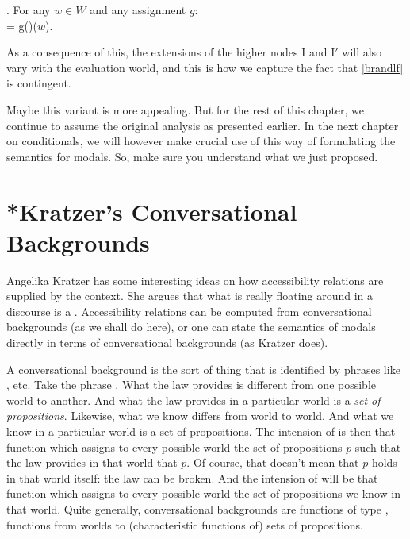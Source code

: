 \ex. For any $w\in W$ and any assignment $g$: \\
 = g()($w$).

As a consequence of this, the extensions of the higher nodes I and
I$'$ will also vary with the evaluation world, and this is how we
capture the fact that \ref{brandlf} is contingent.

Maybe this variant is more appealing. But for the rest of this
chapter, we continue to assume the original analysis as presented
earlier. In the next chapter on conditionals, we will however make
crucial use of this way of formulating the semantics for modals. So,
make sure you understand what we just proposed.

\section{*Kratzer's Conversational Backgrounds} \label{sec:kratz-conv-backgr}

Angelika Kratzer has some interesting ideas on how accessibility
relations are supplied by the context. She argues that what is really
floating around in a discourse is a .
Accessibility relations can be computed from conversational
backgrounds (as we shall do here), or one can state the semantics of
modals directly in terms of conversational backgrounds (as Kratzer
does).

A conversational background is the sort of thing that is identified by
phrases like , etc.
Take the phrase . What the law
provides is different from one possible world to another. And what the
law provides in a particular world is a \emph{set of propositions}.
Likewise, what we know differs from world to world. And what we know
in a particular world is a set of propositions. The intension of
 is then that function which assigns
to every possible world the set of propositions $p$ such that the law
provides in that world that $p$. Of course, that doesn't mean that $p$
holds in that world itself: the law can be broken. And the intension
of  will be that function which assigns to
every possible world the set of propositions we know in that world.
Quite generally, conversational backgrounds are functions of type
, functions from worlds to (characteristic
functions of) sets of propositions.

